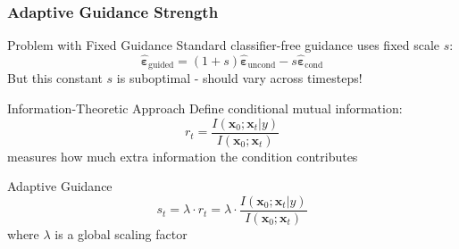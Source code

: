 \documentclass[aspectratio=169]{beamer}
\begin{document}
\begin{frame}
\frametitle{Adaptive Guidance Strength}
\begin{block}{Problem with Fixed Guidance}
Standard classifier-free guidance uses fixed scale $s$:
\begin{equation}
\hat{\boldsymbol{\varepsilon}}_{\text{guided}} = (1+s)\hat{\boldsymbol{\varepsilon}}_{\text{uncond}} - s\hat{\boldsymbol{\varepsilon}}_{\text{cond}}
\end{equation}
But this constant $s$ is suboptimal - should vary across timesteps!
\end{block}

\begin{block}{Information-Theoretic Approach}
Define conditional mutual information:
\begin{equation}
r_t = \frac{I(\mathbf{x}_0; \mathbf{x}_t | y)}{I(\mathbf{x}_0; \mathbf{x}_t)}
\end{equation}
measures how much extra information the condition contributes
\end{block}

\begin{block}{Adaptive Guidance}
\begin{equation}
s_t = \lambda \cdot r_t = \lambda \cdot \frac{I(\mathbf{x}_0; \mathbf{x}_t | y)}{I(\mathbf{x}_0; \mathbf{x}_t)}
\end{equation}
where $\lambda$ is a global scaling factor
\end{block}
\end{frame}
\end{document}

